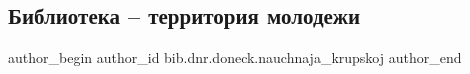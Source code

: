  
 
 
 
 

\subsection{Библиотека – территория молодежи}
\label{sec:21_01_2022.stz.bib.dnr.doneck.nauchnaja_krupskoj.1.kvest_den_studenta}
 
\ifcmt
 author_begin
   author_id bib.dnr.doneck.nauchnaja_krupskoj
 author_end
\fi
